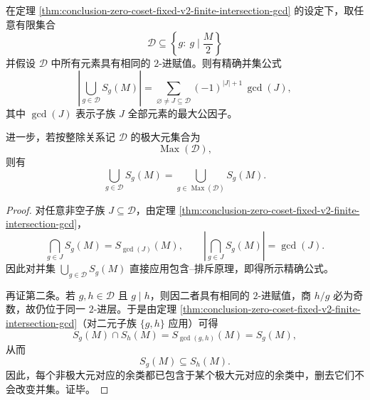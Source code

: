 \begin{corollary}\label{cor:conclusion-zero-coset-fixed-v2-union-inclusion-exclusion-maximal}
在定理 \ref{thm:conclusion-zero-coset-fixed-v2-finite-intersection-gcd} 的设定下，取任意有限集合
\[
\mathcal D\subseteq \left\{g:\ g\mid \frac{M}{2}\right\}
\]
并假设 \(\mathcal D\) 中所有元素具有相同的 \(2\)-进赋值。则有精确并集公式
\[
\boxed{\;
\left|\bigcup_{g\in\mathcal D}S_g(M)\right|
=
\sum_{\varnothing\neq J\subseteq \mathcal D}
(-1)^{|J|+1}\,\gcd(J),\;}
\]
其中 \(\gcd(J)\) 表示子族 \(J\) 全部元素的最大公因子。

进一步，若按整除关系记 \(\mathcal D\) 的极大元集合为
\[
\operatorname{Max}(\mathcal D),
\]
则有
\[
\boxed{\;
\bigcup_{g\in\mathcal D}S_g(M)
=
\bigcup_{g\in \operatorname{Max}(\mathcal D)}S_g(M).\;}
\]
\end{corollary}
\begin{proof}
对任意非空子族 \(J\subseteq\mathcal D\)，由定理 \ref{thm:conclusion-zero-coset-fixed-v2-finite-intersection-gcd}，
\[
\bigcap_{g\in J}S_g(M)=S_{\gcd(J)}(M),
\qquad
\left|\bigcap_{g\in J}S_g(M)\right|=\gcd(J).
\]
因此对并集 \(\bigcup_{g\in\mathcal D}S_g(M)\) 直接应用包含--排斥原理，即得所示精确公式。

再证第二条。若 \(g,h\in\mathcal D\) 且 \(g\mid h\)，则因二者具有相同的 \(2\)-进赋值，商 \(h/g\) 必为奇数，故仍位于同一 \(2\)-进层。于是由定理 \ref{thm:conclusion-zero-coset-fixed-v2-finite-intersection-gcd}（对二元子族 \(\{g,h\}\) 应用）可得
\[
S_g(M)\cap S_h(M)=S_{\gcd(g,h)}(M)=S_g(M),
\]
从而
\[
S_g(M)\subseteq S_h(M).
\]
因此，每个非极大元对应的余类都已包含于某个极大元对应的余类中，删去它们不会改变并集。证毕。
\end{proof}

